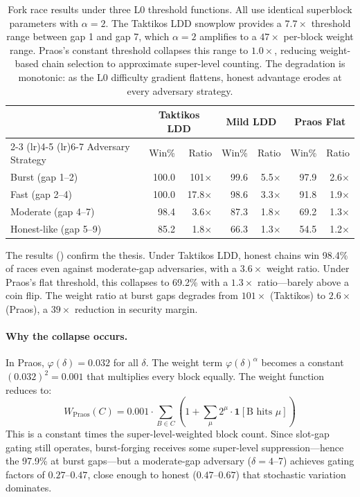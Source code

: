 \documentclass[11pt]{article}
\newcommand{\threshold}{\varphi}
\begin{document}
\begin{table}[t]
\centering
\begin{tabular}{lrrrrrr}
\toprule
& \multicolumn{2}{c}{Taktikos LDD} & \multicolumn{2}{c}{Mild LDD} & \multicolumn{2}{c}{Praos Flat} \\
\cmidrule(lr){2-3} \cmidrule(lr){4-5} \cmidrule(lr){6-7}
Adversary Strategy & Win\% & Ratio & Win\% & Ratio & Win\% & Ratio \\
\midrule
Burst (gap 1--2) & 100.0 & 101$\times$ & 99.6 & 5.5$\times$ & 97.9 & 2.6$\times$ \\
Fast (gap 2--4) & 100.0 & 17.8$\times$ & 98.6 & 3.3$\times$ & 91.8 & 1.9$\times$ \\
Moderate (gap 4--7) & 98.4 & 3.6$\times$ & 87.3 & 1.8$\times$ & 69.2 & 1.3$\times$ \\
Honest-like (gap 5--9) & 85.2 & 1.8$\times$ & 66.3 & 1.3$\times$ & 54.5 & 1.2$\times$ \\
\bottomrule
\end{tabular}
\caption{Fork race results under three L0 threshold functions. All use identical superblock parameters with $\alpha = 2$. The Taktikos LDD snowplow provides a $7.7\times$ threshold range between gap 1 and gap 7, which $\alpha = 2$ amplifies to a $47\times$ per-block weight range. Praos's constant threshold collapses this range to $1.0\times$, reducing weight-based chain selection to approximate super-level counting. The degradation is monotonic: as the L0 difficulty gradient flattens, honest advantage erodes at every adversary strategy.}
\label{tab:l0comparison}
\end{table}

The results () confirm the thesis. Under Taktikos LDD, honest chains win 98.4\% of races even against moderate-gap adversaries, with a $3.6\times$ weight ratio. Under Praos's flat threshold, this collapses to 69.2\% with a $1.3\times$ ratio---barely above a coin flip. The weight ratio at burst gaps degrades from $101\times$ (Taktikos) to $2.6\times$ (Praos), a $39\times$ reduction in security margin.

\paragraph{Why the collapse occurs.} In Praos, $\threshold(\delta) = 0.032$ for all $\delta$. The weight term $\threshold(\delta)^\alpha$ becomes a constant $(0.032)^2 = 0.001$ that multiplies every block equally. The weight function reduces to:
\[
W_{\text{Praos}}(C) = 0.001 \cdot \sum_{B \in C} \left(1 + \textstyle\sum_{\mu} 2^\mu \cdot \mathbf{1}[\text{B hits } \mu]\right)
\]
This is a constant times the super-level-weighted block count. Since slot-gap gating still operates, burst-forging receives some super-level suppression---hence the 97.9\% at burst gaps---but a moderate-gap adversary ($\delta = 4$--7) achieves gating factors of $0.27$--$0.47$, close enough to honest ($0.47$--$0.67$) that stochastic variation dominates.
\end{document}
